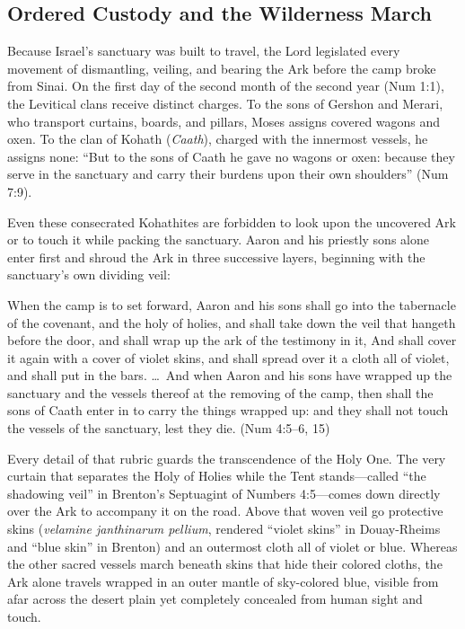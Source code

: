\subsection{Ordered Custody and the Wilderness March}
\label{subsec:ordered-custody-march}

Because Israel's sanctuary was built to travel, the Lord legislated every movement of dismantling, veiling, and bearing the Ark before the camp broke from Sinai. On the first day of the second month of the second year (Num 1:1), the Levitical clans receive distinct charges. To the sons of Gershon and Merari, who transport curtains, boards, and pillars, Moses assigns covered wagons and oxen. To the clan of Kohath (\textit{Caath}), charged with the innermost vessels, he assigns none: ``But to the sons of Caath he gave no wagons or oxen: because they serve in the sanctuary and carry their burdens upon their own shoulders'' (Num 7:9).

Even these consecrated Kohathites are forbidden to look upon the uncovered Ark or to touch it while packing the sanctuary. Aaron and his priestly sons alone enter first and shroud the Ark in three successive layers, beginning with the sanctuary's own dividing veil:

\begin{scriptureblock}
When the camp is to set forward, Aaron and his sons shall go into the tabernacle of the covenant, and the holy of holies, and shall take down the veil that hangeth before the door, and shall wrap up the ark of the testimony in it, And shall cover it again with a cover of violet skins, and shall spread over it a cloth all of violet, and shall put in the bars. \ldots\ And when Aaron and his sons have wrapped up the sanctuary and the vessels thereof at the removing of the camp, then shall the sons of Caath enter in to carry the things wrapped up: and they shall not touch the vessels of the sanctuary, lest they die. \textnormal{(Num 4:5--6, 15)}
\end{scriptureblock}

Every detail of that rubric guards the transcendence of the Holy One. The very curtain that separates the Holy of Holies while the Tent stands---called ``the shadowing veil'' in Brenton's Septuagint of Numbers 4:5---comes down directly over the Ark to accompany it on the road. Above that woven veil go protective skins (\textit{velamine janthinarum pellium}, rendered ``violet skins'' in Douay-Rheims and ``blue skin'' in Brenton) and an outermost cloth all of violet or blue. Whereas the other sacred vessels march beneath skins that hide their colored cloths, the Ark alone travels wrapped in an outer mantle of sky-colored blue, visible from afar across the desert plain yet completely concealed from human sight and touch.

